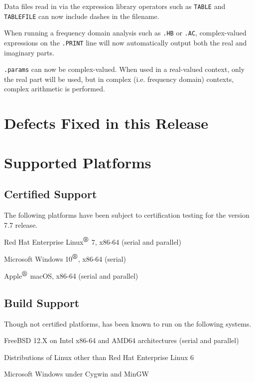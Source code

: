 \documentclass[letterpaper]{scrartcl}
\begin{document}
\begin{XyceItemize}
\item Data files read in via the expression library operators such as
     \texttt{TABLE} and \texttt{TABLEFILE} can now include dashes in the
     filename.

\item When running a frequency domain analysis such as \texttt{.HB} or
     \texttt{.AC}, complex-valued expressions on the \texttt{.PRINT} line will
     now automatically output both the real and imaginary parts.

\item \texttt{.params} can now be complex-valued.  When used in a real-valued
     context, only the real part will be used, but in complex (i.e. frequency
     domain) contexts, complex arithmetic is performed.

\end{XyceItemize}

\newpage
\section{Defects Fixed in this Release}


\newpage
\section{Supported Platforms}
\subsection*{Certified Support}
The following platforms have been subject to certification testing for the
\Xyce{} version 7.7 release.
\begin{XyceItemize}
  \item Red Hat Enterprise Linux${}^{\mbox{\textregistered}}$ 7, x86-64 (serial and parallel)
  \item Microsoft Windows 10${}^{\mbox{\textregistered}}$, x86-64 (serial)
  \item Apple${}^{\mbox{\textregistered}}$ macOS, x86-64 (serial and parallel)
\end{XyceItemize}


\subsection*{Build Support}
Though not certified platforms, \Xyce{} has been known to run on the following
systems.
\begin{XyceItemize}
  \item FreeBSD 12.X on Intel x86-64 and AMD64 architectures (serial
    and parallel)
  \item Distributions of Linux other than Red Hat Enterprise Linux 6
  \item Microsoft Windows under Cygwin and MinGW
\end{XyceItemize}
\end{document}
